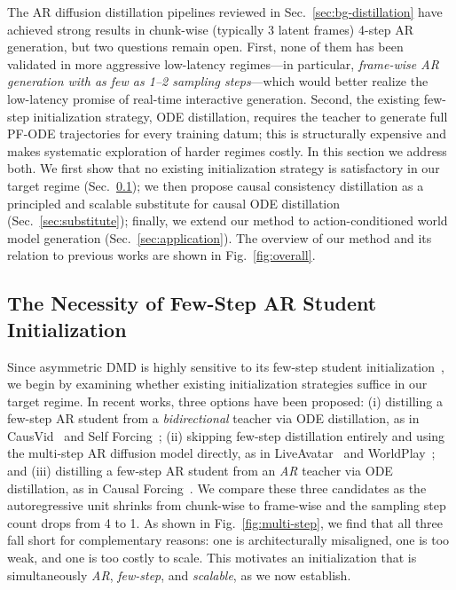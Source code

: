\documentclass{llmxive}
\begin{document}
The AR diffusion distillation pipelines reviewed in Sec.~\ref{sec:bg-distillation} have achieved strong results in chunk-wise (typically 3 latent frames) 4-step AR generation, but two questions remain open. First, none of them has been validated in more aggressive low-latency regimes---in particular, \emph{frame-wise AR generation with as few as 1--2 sampling steps}---which would better realize the low-latency promise of real-time interactive generation. Second, the existing few-step initialization strategy, ODE distillation, requires the teacher to generate full PF-ODE trajectories for every training datum; this is structurally expensive and makes systematic exploration of harder regimes costly. In this section we address both. We first show that no existing initialization strategy is satisfactory in our target regime (Sec.~\ref{sec:necessity}); we then propose causal consistency distillation as a principled and scalable substitute for causal ODE distillation (Sec.~\ref{sec:substitute}); finally, we extend our method to action-conditioned world model generation (Sec.~\ref{sec:application}). The overview of our method and its relation to previous works are shown in Fig.~\ref{fig:overall}.

\subsection{The Necessity of Few-Step AR Student Initialization}
\label{sec:necessity}

Since asymmetric DMD is highly sensitive to its few-step student initialization~\cite{zhu2026causal}, we begin by examining whether existing initialization strategies suffice in our target regime. In recent works, three options have been proposed: (i) distilling a few-step AR student from a \emph{bidirectional} teacher via ODE distillation, as in CausVid~\cite{yin2025slow} and Self Forcing~\cite{huang2025self}; (ii) skipping few-step distillation entirely and using the multi-step AR diffusion model directly, as in LiveAvatar~\cite{huang2025live} and WorldPlay~\cite{sun2025worldplay}; and (iii) distilling a few-step AR student from an \emph{AR} teacher via ODE distillation, as in Causal Forcing~\cite{zhu2026causal}. We compare these three candidates as the autoregressive unit shrinks from chunk-wise to frame-wise and the sampling step count drops from 4 to 1. As shown in Fig.~\ref{fig:multi-step}, we find that all three fall short for complementary reasons: one is architecturally misaligned, one is too weak, and one is too costly to scale. This motivates an initialization that is simultaneously \emph{AR}, \emph{few-step}, and \emph{scalable}, as we now establish.
\end{document}
